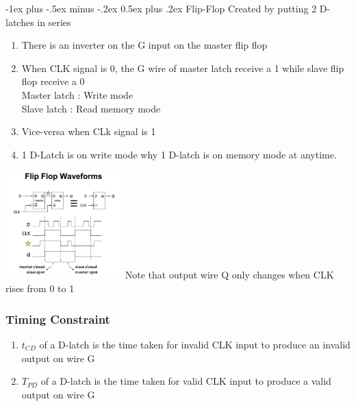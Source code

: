 \documentclass[9pt,landscape]{extarticle}
\makeatletter
\renewcommand{\section}{\@startsection{section}{1}{0mm}%
                                {-1ex plus -.5ex minus -.2ex}%
                                {0.5ex plus .2ex}%
                                {\normalfont\large\bfseries}}
\makeatother
\begin{document}
\begin{multicols*}{5}
\section{Flip-Flop}
Created by putting 2 D-latches in series \\

\begin{enumerate}
\item There is an inverter on the G input on the master flip flop
\item When CLK signal is 0, the G wire of master latch receive a 1 while slave flip flop receive a 0 \\
Master latch : Write mode \\
Slave latch : Read memory mode
\item Vice-versa when CLk signal is 1
\item 1 D-Latch is on write mode why 1 D-latch is on memory mode at anytime.
\end{enumerate}
\includegraphics[width = 4.5cm]{Flip_flop_waveform}
Note that output wire Q only changes when CLK rises from 0 to 1
\subsubsection{Timing Constraint}
\begin{enumerate}
\item $t_{CD}$ of a D-latch is the time taken for invalid CLK input to produce an invalid output on wire G
\item $T_{PD}$ of a D-latch is the time taken for valid CLK input to produce a valid output on wire G
\end{enumerate}

\end{multicols*}
\end{document}
